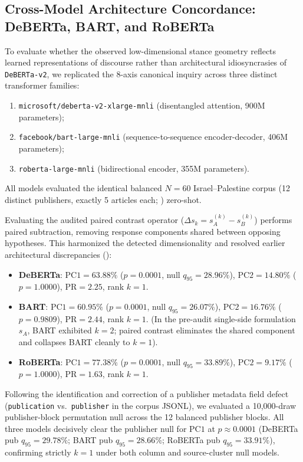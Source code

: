\subsection{Cross-Model Architecture Concordance: DeBERTa, BART, and RoBERTa}
\label{sec:cross_model_results}

To evaluate whether the observed low-dimensional stance geometry reflects learned representations of discourse rather than architectural idiosyncrasies of \texttt{DeBERTa-v2}, we replicated the 8-axis canonical inquiry across three distinct transformer families:
\begin{enumerate}
    \item \texttt{microsoft/deberta-v2-xlarge-mnli} (disentangled attention, 900M parameters);
    \item \texttt{facebook/bart-large-mnli} (sequence-to-sequence encoder-decoder, 406M parameters);
    \item \texttt{roberta-large-mnli} (bidirectional encoder, 355M parameters).
\end{enumerate}
All models evaluated the identical balanced $N=60$ Israel--Palestine corpus (12 distinct publishers, exactly 5 articles each; ) zero-shot.

Evaluating the audited paired contrast operator ($\Delta s_k = s_A^{(k)} - s_B^{(k)}$) performs paired subtraction, removing response components shared between opposing hypotheses. This harmonized the detected dimensionality and resolved earlier architectural discrepancies ():
\begin{itemize}
    \item \textbf{DeBERTa}: $\mathrm{PC1} = 63.88\%$ ($p = 0.0001$, null $q_{95} = 28.96\%$), $\mathrm{PC2} = 14.80\%$ ($p = 1.0000$), $\mathrm{PR} = 2.25$, rank $k=1$.
    \item \textbf{BART}: $\mathrm{PC1} = 60.95\%$ ($p = 0.0001$, null $q_{95} = 26.07\%$), $\mathrm{PC2} = 16.76\%$ ($p = 0.9809$), $\mathrm{PR} = 2.44$, rank $k=1$. (In the pre-audit single-side formulation $s_A$, BART exhibited $k=2$; paired contrast eliminates the shared component and collapses BART cleanly to $k=1$).
    \item \textbf{RoBERTa}: $\mathrm{PC1} = 77.38\%$ ($p = 0.0001$, null $q_{95} = 33.89\%$), $\mathrm{PC2} = 9.17\%$ ($p = 1.0000$), $\mathrm{PR} = 1.63$, rank $k=1$.
\end{itemize}

Following the identification and correction of a publisher metadata field defect (\texttt{publication} vs.\ \texttt{publisher} in the corpus JSONL), we evaluated a 10,000-draw publisher-block permutation null across the 12 balanced publisher blocks. All three models decisively clear the publisher null for $\mathrm{PC1}$ at $p \approx 0.0001$ (DeBERTa pub $q_{95} = 29.78\%$; BART pub $q_{95} = 28.66\%$; RoBERTa pub $q_{95} = 33.91\%$), confirming strictly $k=1$ under both column and source-cluster null models.

